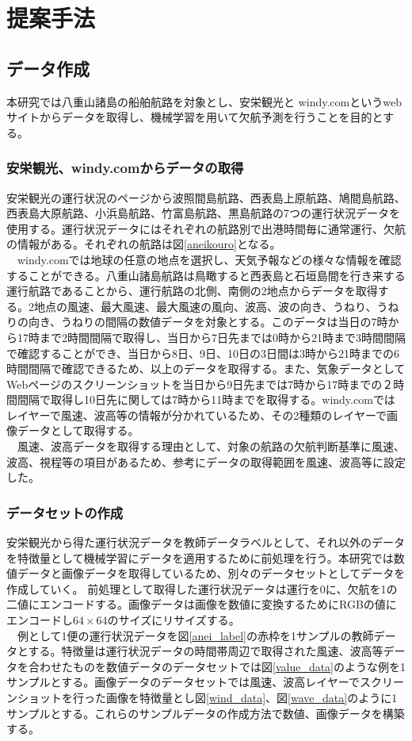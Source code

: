 \chapter{提案手法}
\label{chap:propose}

\section{データ作成}
本研究では八重山諸島の船舶航路を対象とし、安栄観光\cite{anei}と windy.com\cite{windy}というwebサイトからデータを取得し、機械学習を用いて欠航予測を行うことを目的とする。

\subsection{安栄観光、windy.comからデータの取得}
安栄観光\cite{anei}の運行状況のページから波照間島航路、西表島上原航路、鳩間島航路、西表島大原航路、小浜島航路、竹富島航路、黒島航路の7つの運行状況データを使用する。運行状況データにはそれぞれの航路別で出港時間毎に通常運行、欠航の情報がある。それぞれの航路は図\ref{aneikouro}となる。
\\　windy.com\cite{windy}では地球の任意の地点を選択し、天気予報などの様々な情報を確認することができる。八重山諸島航路は鳥瞰すると西表島と石垣島間を行き来する運行航路であることから、運行航路の北側、南側の2地点からデータを取得する。2地点の風速、最大風速、最大風速の風向、波高、波の向き、うねり、うねりの向き、うねりの間隔の数値データを対象とする。このデータは当日の7時から17時まで2時間間隔で取得し、当日から7日先までは0時から21時まで3時間間隔で確認することができ、当日から8日、9日、10日の3日間は3時から21時までの6時間間隔で確認できるため、以上のデータを取得する。また、気象データとしてWebページのスクリーンショットを当日から9日先までは7時から17時までの２時間間隔で取得し10日先に関しては7時から11時までを取得する。windy.com\cite{windy}ではレイヤーで風速、波高等の情報が分かれているため、その2種類のレイヤーで画像データとして取得する。
\\　風速、波高データを取得する理由として、対象の航路の欠航判断基準\cite{stan}に風速、波高、視程等の項目があるため、参考にデータの取得範囲を風速、波高等に設定した。
\subsection{データセットの作成}
安栄観光\cite{anei}から得た運行状況データを教師データラベルとして、それ以外のデータを特徴量として機械学習にデータを適用するために前処理を行う。本研究では数値データと画像データを取得しているため、別々のデータセットとしてデータを作成していく。
前処理として取得した運行状況データは運行を0に、欠航を1の二値にエンコードする。画像データは画像を数値に変換するためにRGBの値にエンコードし$64\times64$のサイズにリサイズする。
\\　例として1便の運行状況データを図\ref{anei_label}の赤枠を1サンプルの教師データとする。特徴量は運行状況データの時間帯周辺で取得された風速、波高等データを合わせたものを数値データのデータセットでは図\ref{value_data}のような例を1サンプルとする。画像データのデータセットでは風速、波高レイヤーでスクリーンショットを行った画像を特徴量とし図\ref{wind_data}、図\ref{wave_data}のように1サンプルとする。これらのサンプルデータの作成方法で数値、画像データを構築する。

